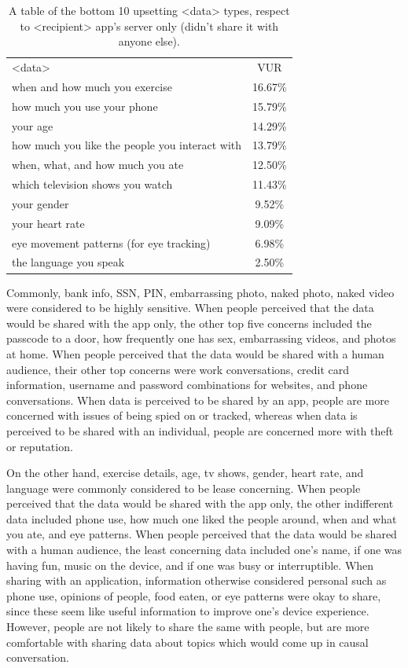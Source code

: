 \documentclass{acm_proc_article-sp}
\begin{document}
\begin{table}%
\begin{center}
\begin{tabular}{| l | c |}
<data> &  VUR  \\
when and how much you exercise & 16.67\% \\
how much you use your phone & 15.79\% \\
your age & 14.29\% \\
how much you like the people you interact with & 13.79\% \\
when, what, and how much you ate & 12.50\% \\
which television shows you watch & 11.43\% \\
your gender & 9.52\% \\
your heart rate & 9.09\% \\
eye movement patterns (for eye tracking) & 6.98\% \\
the language you speak & 2.50\% \\
\end{tabular}
\caption{A table of the bottom 10 upsetting <data> types, respect to <recipient> app's server only (didn't share it with anyone else).}
\label{notsharedbottom10}
\end{center}
\end{table}


Commonly, bank info, SSN, PIN, embarrassing photo, naked photo, naked video were considered to be highly sensitive. When people perceived that the data would be shared with the app only, the other top five concerns included the passcode to a door, how frequently one has sex, embarrassing videos, and photos at home. When people perceived that the data would be shared with a human audience, their other top concerns were work conversations, credit card information, username and password combinations for websites, and phone conversations. When data is perceived to be shared by an app, people are more concerned with issues of being spied on or tracked, whereas when data is perceived to be shared with an individual, people are concerned more with theft or reputation. 

On the other hand, exercise details, age, tv shows, gender, heart rate, and language were commonly considered to be lease concerning. When people perceived that the data would be shared with the app only, the other indifferent data included phone use, how much one liked the people around, when and what you ate, and eye patterns. When people perceived that the data would be shared with a human audience, the least concerning data included one's name, if one was having fun, music on the device, and if one was busy or interruptible. When sharing with an application, information otherwise considered personal such as phone use, opinions of people, food eaten, or eye patterns were okay to share, since these seem like useful information to improve one's device experience. However, people are not likely to share the same with people, but are more comfortable with sharing data about topics which would come up in causal conversation.
\end{document}
